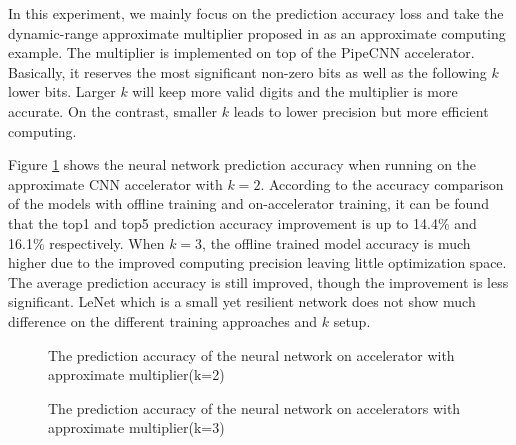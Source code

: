 In this experiment, we mainly focus on the prediction accuracy loss and 
take the dynamic-range approximate multiplier proposed in \cite{Approximate_Multiplier_31} as 
an approximate computing example. The multiplier is implemented on top of the PipeCNN
accelerator. Basically, it reserves the most significant non-zero bits as well as the 
following $k$ lower bits. Larger $k$ will keep more valid digits and the multiplier 
is more accurate. On the contrast, smaller $k$ leads to lower precision but 
more efficient computing. 

Figure \ref{fig:k2-approximate-multiplier} shows the 
neural network prediction accuracy when running on the approximate CNN 
accelerator with $k=2$. According to the accuracy comparison of the models with 
offline training and on-accelerator training, it can be found that the 
top1 and top5 prediction accuracy improvement is up to 14.4\% and 16.1\% respectively. 
When $k=3$, the offline trained model accuracy is much higher due to the improved 
computing precision leaving little optimization space. The average prediction 
accuracy is still improved, though the improvement is less significant.
LeNet which is a small yet resilient network does not show much 
difference on the different training approaches and $k$ setup.
\begin{figure}
        \center
        \qquad
        \caption{The prediction accuracy of the neural network on accelerator with approximate multiplier(k=2)}
        \label{fig:k2-approximate-multiplier}
\end{figure}

\begin{figure}
        \center
        \qquad
        \caption{The prediction accuracy of the neural network on accelerators with approximate multiplier(k=3)}
        \label{fig:k3-approximate-mltiplier}
\end{figure}

